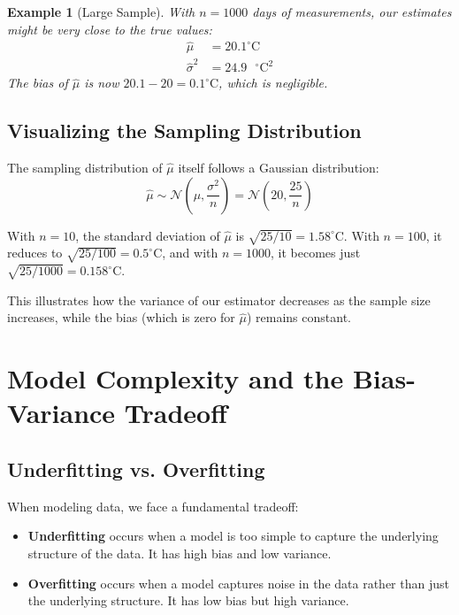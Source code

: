 \documentclass{article}
\newtheorem{example}{Example}
\begin{document}
\begin{example}[Large Sample]
With $n = 1000$ days of measurements, our estimates might be very close to the true values:
\begin{align*}
\hat{\mu} &= 20.1^\circ\text{C} \\
\hat{\sigma}^2 &= 24.9\text{ }^\circ\text{C}^2
\end{align*}
The bias of $\hat{\mu}$ is now $20.1 - 20 = 0.1^\circ\text{C}$, which is negligible.
\end{example}

\subsection{Visualizing the Sampling Distribution}

The sampling distribution of $\hat{\mu}$ itself follows a Gaussian distribution:
\[
\hat{\mu} \sim \mathcal{N}\left(\mu, \frac{\sigma^2}{n}\right) = \mathcal{N}\left(20, \frac{25}{n}\right)
\]

With $n = 10$, the standard deviation of $\hat{\mu}$ is $\sqrt{25/10} = 1.58^\circ\text{C}$. With $n = 100$, it reduces to $\sqrt{25/100} = 0.5^\circ\text{C}$, and with $n = 1000$, it becomes just $\sqrt{25/1000} = 0.158^\circ\text{C}$.

This illustrates how the variance of our estimator decreases as the sample size increases, while the bias (which is zero for $\hat{\mu}$) remains constant.

\section{Model Complexity and the Bias-Variance Tradeoff}

\subsection{Underfitting vs. Overfitting}

When modeling data, we face a fundamental tradeoff:

\begin{itemize}
\item \textbf{Underfitting} occurs when a model is too simple to capture the underlying structure of the data. It has high bias and low variance.
\item \textbf{Overfitting} occurs when a model captures noise in the data rather than just the underlying structure. It has low bias but high variance.
\end{itemize}
\end{document}
